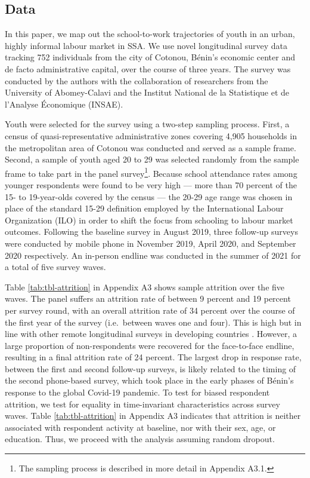 \documentclass[
  a4paper, twoside, 12pt]{book}
\begin{document}
\hypertarget{survey-data}{%
\subsection*{Data}\label{survey-data}}

In this paper, we map out the school-to-work trajectories of youth in an urban, highly informal labour market in SSA. We use novel longitudinal survey data tracking 752 individuals from the city of Cotonou, Bénin's economic center and de facto administrative capital, over the course of three years. The survey was conducted by the authors with the collaboration of researchers from the University of Abomey-Calavi and the Institut National de la Statistique et de l'Analyse Économique (INSAE).

Youth were selected for the survey using a two-step sampling process. First, a census of quasi-representative administrative zones covering 4,905 households in the metropolitan area of Cotonou was conducted and served as a sample frame. Second, a sample of youth aged 20 to 29 was selected randomly from the sample frame to take part in the panel survey\footnote{The sampling process is described in more detail in Appendix A3.1.}. Because school attendance rates among younger respondents were found to be very high --- more than 70 percent of the 15- to 19-year-olds covered by the census --- the 20-29 age range was chosen in place of the standard 15-29 definition employed by the International Labour Organization (ILO) in order to shift the focus from schooling to labour market outcomes. Following the baseline survey in August 2019, three follow-up surveys were conducted by mobile phone in November 2019, April 2020, and September 2020 respectively. An in-person endline was conducted in the summer of 2021 for a total of five survey waves.

Table \ref{tab:tbl-attrition} in Appendix A3 shows sample attrition over the five waves. The panel suffers an attrition rate of between 9 percent and 19 percent per survey round, with an overall attrition rate of 34 percent over the course of the first year of the survey (i.e.~between waves one and four). This is high but in line with other remote longitudinal surveys in developing countries \autocite{demombynes2013,ballivian2015}. However, a large proportion of non-respondents were recovered for the face-to-face endline, resulting in a final attrition rate of 24 percent. The largest drop in response rate, between the first and second follow-up surveys, is likely related to the timing of the second phone-based survey, which took place in the early phases of Bénin's response to the global Covid-19 pandemic. To test for biased respondent attrition, we test for equality in time-invariant characteristics across survey waves. Table \ref{tab:tbl-attrition} in Appendix A3 indicates that attrition is neither associated with respondent activity at baseline, nor with their sex, age, or education. Thus, we proceed with the analysis assuming random dropout.
\end{document}
